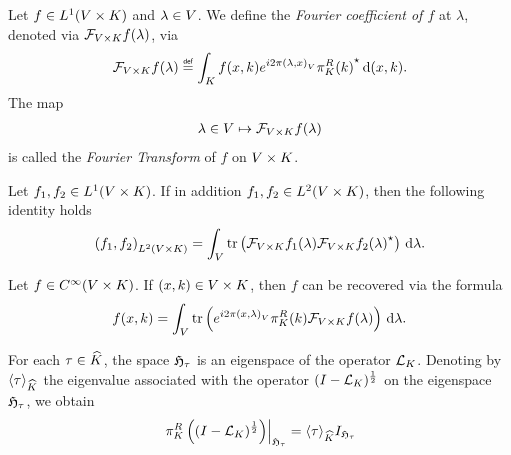 \begin{definition}
    Let $f \in \Lebesgue 1 \GroupDirect$ and $\lambda \in \VectorSpace$.
    We define the \emph{Fourier coefficient of $f$} at $\lambda$,
    denoted via $\Fourier[\GroupDirect] f(\lambda)$, via
    \begin{align*}
        \Fourier [\GroupDirect] f(\lambda) \defeq \int_\CompactGroup f(x, k) \e^{\i \turn \ip \lambda x} \adj{\RightRegularRepresentation(k)} \dd (x, k).
    \end{align*}
    The map
    \begin{align*}
        \lambda \in \VectorSpace \mapsto \Fourier [\GroupDirect] f(\lambda)
    \end{align*}
    is called the \emph{Fourier Transform} of $f$ on $\GroupDirect$.
\end{definition}

\begin{proposition}
    Let $f_1, f_2 \in \Lebesgue 1 \GroupDirect$.
    If in addition $f_1, f_2 \in \Lebesgue 2 \GroupDirect$,
    then the following identity holds
    \begin{align*}
        \ip [\Lebesgue 2 \GroupDirect] {f_1} {f_2}
        = \int_\VectorSpace \tr\left(\Fourier [\GroupDirect] f_1(\lambda) \adj{\Fourier [\GroupDirect] f_2(\lambda)}\right) \dd \lambda.
    \end{align*}
\end{proposition}

\begin{proposition}
    Let $f \in \SmoothFunctions \GroupDirect$.
    If $(x, k) \in \GroupDirect$,
    then $f$ can be recovered via the formula
    \begin{align*}
        f(x, k) = \int_\VectorSpace \tr\left(\e^{\i \turn \ip x \lambda} \RightRegularRepresentation(k) \Fourier[\GroupDirect] f(\lambda) \right) \dd \lambda.
    \end{align*}
\end{proposition}

\begin{lemma}
    For each $\tau \in \dualGroup\CompactGroup$,
    the space $\HilbertCompactGroup{\tau}$ is an eigenspace of the operator $\Laplacian[\CompactGroup]$.
    Denoting by $\JapaneseBracket{\CompactGroup}{\tau}$ the eigenvalue associated with the operator $\BesselPotential[\CompactGroup]{1}$ on the eigenspace $\HilbertCompactGroup\tau$, we obtain
    \begin{align*}
        \eval{\RightRegularRepresentation\left(\BesselPotential[\CompactGroup]{1}\right)}{\HilbertCompactGroup\tau}
        = \JapaneseBracket{\CompactGroup}{\tau} \Id{\HilbertCompactGroup\tau}
    \end{align*}
\end{lemma}

